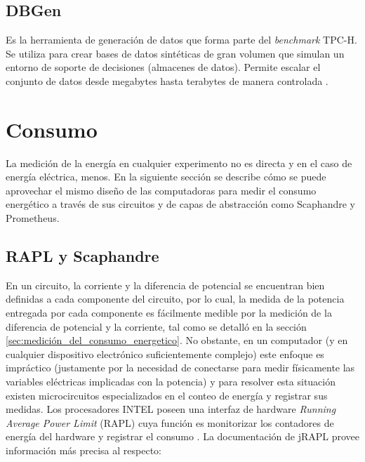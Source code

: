 \documentclass[12pt, letter paper]{report}
\begin{document}
      \subsection{DBGen} %
      \label{sub:dbgen}
        Es la herramienta de generación de datos que forma parte del
        \textit{benchmark} TPC-H. Se utiliza para crear bases de datos
        sintéticas de gran volumen que simulan un entorno de soporte de
        decisiones (almacenes de datos). Permite escalar el conjunto de datos
        desde megabytes hasta terabytes de manera controlada \cite{tpch_dbgen}.

    \section{Consumo} %
    \label{sec:consumo}
      La medición de la energía en cualquier experimento no es directa y en el
      caso de energía eléctrica, menos. En la siguiente sección se describe cómo
      se puede aprovechar el mismo diseño de las computadoras para medir el
      consumo energético a través de sus circuitos y de capas de abstracción
      como Scaphandre y Prometheus.

      \subsection{RAPL y Scaphandre} %
      \label{sub:rapl_y_scaphandre}
        En un circuito, la corriente y la diferencia de potencial se encuentran
        bien definidas a cada componente del circuito, por lo cual, la medida de
        la potencia entregada por cada componente es fácilmente medible por la
        medición de la diferencia de potencial y la corriente, tal como se
        detalló en la sección \ref{sec:medición_del_consumo_energetico}. No
        obstante, en un computador (y en cualquier dispositivo electrónico
        suficientemente complejo) este enfoque es impráctico (justamente por la
        necesidad de conectarse para medir físicamente las variables eléctricas
        implicadas con la potencia) y para resolver esta situación existen
        microcircuitos especializados en el conteo de energía y registrar sus
        medidas. Los procesadores INTEL poseen una interfaz de hardware
        \textit{Running Average Power Limit} (RAPL) cuya función es monitorizar
        los contadores de energía del hardware y registrar el consumo
        \cite{intelrunning2022}. La documentación de jRAPL provee información
        más precisa al respecto:
\end{document}
